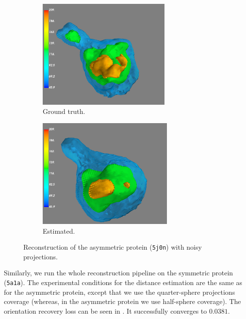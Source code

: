 \begin{figure}[ht!]
    \centering
    \begin{subfigure}[b]{0.45\textwidth}
        \includegraphics[height=5.5cm]{images/5j0n_reconstruction_GT_noise16.png}
        \caption{Ground truth.}
    \end{subfigure}
    \hfill
    \begin{subfigure}[b]{0.5\textwidth}
    \centering
        \includegraphics[height=5.5cm]{images/5j0n_reconstruction_noise16.png}
        \caption{Estimated.}
    \end{subfigure}
    \caption{
        Reconstruction of the asymmetric protein (\texttt{5j0n}) with noisy projections.
    }\label{fig:5j0n-reconstruction-noise16}
\end{figure}




Similarly, we run the whole reconstruction pipeline on the symmetric protein (\texttt{5a1a}). 
The experimental conditions for the distance estimation are the same as for the asymmetric protein, except that we use the quarter-sphere projections coverage (whereas, in the asymmetric protein we use half-sphere coverage).
The orientation recovery loss can be seen in . It successfully converges to $0.0381$.

